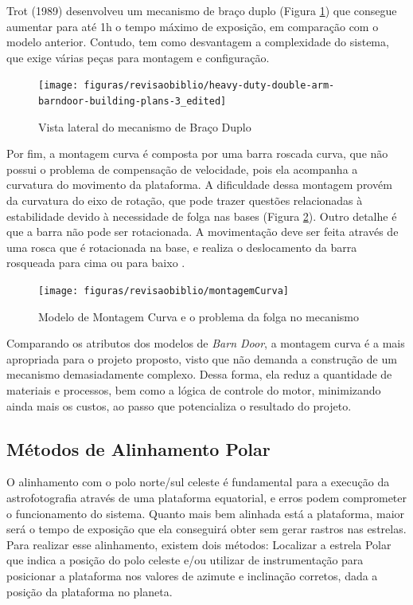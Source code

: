 Trot (1989) desenvolveu um mecanismo de braço duplo (Figura \ref{fig:doublearm}) que consegue aumentar para até 1h o tempo máximo de exposição, em comparação com o modelo anterior. Contudo, tem como desvantagem a complexidade do sistema, que exige várias peças para montagem e configuração.

\begin{figure}[!htb]
	\centering
	\caption{Vista lateral do mecanismo de Braço Duplo}
	\texttt{[image: figuras/revisaobiblio/heavy-duty-double-arm-barndoor-building-plans-3\_edited]}
	\label{fig:doublearm}
\end{figure}

Por fim, a montagem curva é composta por uma barra roscada curva, que não possui o problema de compensação de velocidade, pois ela acompanha a curvatura do movimento da plataforma. A dificuldade dessa montagem provém da curvatura do eixo de rotação, que pode trazer questões relacionadas à estabilidade devido à necessidade de folga nas bases (Figura \ref{fig:montagemCurva}). Outro detalhe é que a barra não pode ser rotacionada. A movimentação deve ser feita através de uma rosca que é rotacionada na base, e realiza o deslocamento da barra rosqueada para cima ou para baixo \cite{site:pentaxBarnDoor}.  

 
 \begin{figure}[!htb]
 	\centering
 	\caption[Modelo de Montagem Curva]{Modelo de Montagem Curva e o problema da folga no mecanismo}
 	\texttt{[image: figuras/revisaobiblio/montagemCurva]}
 	\label{fig:montagemCurva}
 \end{figure}

Comparando os atributos dos modelos de \textit{Barn Door}, a montagem curva é a mais apropriada para o projeto proposto, visto que não demanda a construção de um mecanismo demasiadamente complexo. Dessa forma, ela reduz a quantidade de materiais e processos, bem como a lógica de controle do motor, minimizando ainda mais os custos, ao passo que potencializa o resultado do projeto. 

\subsection{Métodos de Alinhamento Polar}
O alinhamento com o polo norte/sul celeste é fundamental para a execução da astrofotografia através de uma plataforma equatorial, e erros podem comprometer o funcionamento do sistema. Quanto mais bem alinhada está a plataforma, maior será o tempo de exposição que ela conseguirá obter sem gerar rastros nas estrelas. Para realizar esse alinhamento, existem dois métodos: Localizar a estrela Polar que indica a posição do polo celeste e/ou utilizar de instrumentação para posicionar a plataforma nos valores de azimute e inclinação corretos, dada a posição da plataforma no planeta.

